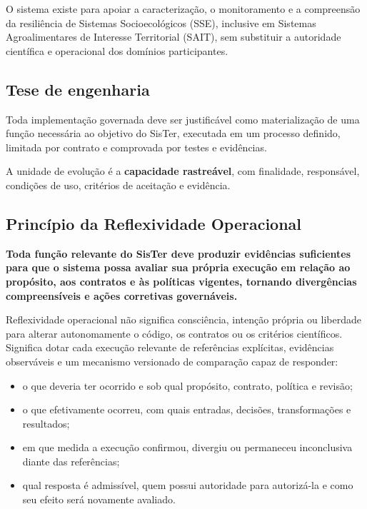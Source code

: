 \documentclass[11pt,a4paper,oneside]{article}
\begin{document}
O sistema existe para apoiar a caracterização, o monitoramento e a compreensão da resiliência de Sistemas Socioecológicos (SSE), inclusive em Sistemas Agroalimentares de Interesse Territorial (SAIT), sem substituir a autoridade científica e operacional dos domínios participantes.

\subsection{Tese de engenharia}
\begin{principio}
Toda implementação governada deve ser justificável como materialização de uma função necessária ao objetivo do SisTer, executada em um processo definido, limitada por contrato e comprovada por testes e evidências.
\end{principio}

A unidade de evolução é a \textbf{capacidade rastreável}, com finalidade, responsável, condições de uso, critérios de aceitação e evidência.

\subsection{Princípio da Reflexividade Operacional}
\label{sec:reflexividade-operacional}
\begin{principio}
\textbf{Toda função relevante do SisTer deve produzir evidências suficientes para que o sistema possa avaliar sua própria execução em relação ao propósito, aos contratos e às políticas vigentes, tornando divergências compreensíveis e ações corretivas governáveis.}
\end{principio}

Reflexividade operacional não significa consciência, intenção própria ou liberdade para alterar autonomamente o código, os contratos ou os critérios científicos. Significa dotar cada execução relevante de referências explícitas, evidências observáveis e um mecanismo versionado de comparação capaz de responder:
\begin{itemize}
  \item o que deveria ter ocorrido e sob qual propósito, contrato, política e revisão;
  \item o que efetivamente ocorreu, com quais entradas, decisões, transformações e resultados;
  \item em que medida a execução confirmou, divergiu ou permaneceu inconclusiva diante das referências;
  \item qual resposta é admissível, quem possui autoridade para autorizá-la e como seu efeito será novamente avaliado.
\end{itemize}
\end{document}
